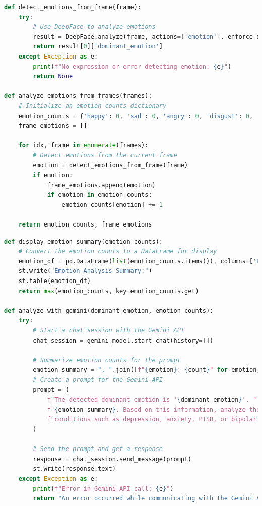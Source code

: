 \begin{tcolorbox}[colback=gray!5!white, colframe=gray!80!black, boxrule=0.5pt, title=Emotion Analysis and Mental Health Insights]
    \begin{lstlisting}[language=Python]
def detect_emotions_from_frame(frame):
    try:
        # Use DeepFace to analyze emotions
        result = DeepFace.analyze(frame, actions=['emotion'], enforce_detection=False)
        return result[0]['dominant_emotion']
    except Exception as e:
        print(f"No expression or error detecting emotion: {e}")
        return None

def analyze_emotions_from_frames(frames):
    # Initialize an emotion counts dictionary
    emotion_counts = {'happy': 0, 'sad': 0, 'angry': 0, 'disgust': 0, 'fear': 0, 'surprise': 0, 'neutral': 0}
    frame_emotions = []

    for idx, frame in enumerate(frames):
        # Detect emotions from the current frame
        emotion = detect_emotions_from_frame(frame)
        if emotion:
            frame_emotions.append(emotion)
            if emotion in emotion_counts:
                emotion_counts[emotion] += 1

    return emotion_counts, frame_emotions
\end{lstlisting}
\end{tcolorbox}
\begin{tcolorbox}[colback=gray!5!white, colframe=gray!80!black, boxrule=0.5pt, title=Emotion Analysis and Mental Health Insights]
    \begin{lstlisting}[language=Python]
def display_emotion_summary(emotion_counts):
    # Convert the emotion counts to a DataFrame for display
    emotion_df = pd.DataFrame(list(emotion_counts.items()), columns=['Emotion', 'Count'])
    st.write("Emotion Analysis Summary:")
    st.table(emotion_df)
    return max(emotion_counts, key=emotion_counts.get)

def analyze_with_gemini(dominant_emotion, emotion_counts):
    try:
        # Start a chat session with the Gemini API
        chat_session = gemini_model.start_chat(history=[])

        # Summarize emotion counts for the prompt
        emotion_summary = ", ".join([f"{emotion}: {count}" for emotion, count in emotion_counts.items()])
        # Create a prompt for the Gemini API
        prompt = (
            f"The detected dominant emotion is '{dominant_emotion}'. "
            f"{emotion_summary}. Based on this information, analyze the potential implications for mental health "
            f"conditions such as depression, anxiety, PTSD, or bipolar disorder. Provide actionable insights in three lines."
        )

        # Send the prompt and get a response
        response = chat_session.send_message(prompt)
        st.write(response.text)
    except Exception as e:
        print(f"Error in Gemini API call: {e}")
        return "An error occurred while communicating with the Gemini API. Please try again later."
    \end{lstlisting}
\end{tcolorbox}

